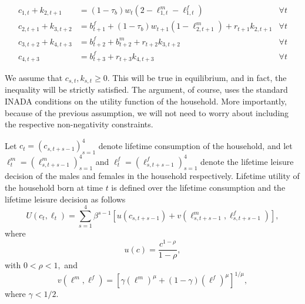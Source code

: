 \documentclass[ProjectUYA]{subfiles}
\begin{document}
  \begin{subequations}
 \label{eq:BCsimplified}
 	 \begin{align}
 	c_{1,t} + k_{2,t+1} &= (1-\tau_b)w_t (2-\ell_{1,t}^m - \ell_{1,t}^f) & \forall t \\
 	c_{2,t+1} + k_{3,t+2} &= b_{t+1}^f+(1-\tau_b)w_{t+1} (1-\ell_{2,t+1}^m ) + r_{t+1}k_{2,t+1} & \forall t \\
 	c_{3,t+2} + k_{4,t+3} &= b_{t+2}^f+ b_{t+2}^m  + r_{t+2}k_{3,t+2} & \forall t \\
 	c_{4,t+3}  &= b_{t+3}^f + r_{t+3}k_{4,t+3} & \forall t
 \end{align}
 \end{subequations}
 
 We assume that $c_{s,t},k_{s,t}\geq 0.$ This will be true in equilibrium, and in fact, the inequality will be strictly satisfied. The argument, of course, uses the standard INADA conditions on the utility function of the household. More importantly, because of the previous assumption, we will not need to worry about including the respective non-negativity constraints. 

 Let $c_t=(c_{s,t+s-1})_{s=1}^4$ denote lifetime consumption of the household, and let $\ell_t^m=(\ell_{s,t+s-1}^m)_{s=1}^4$ and $\ell_t^f=(\ell_{s,t+s-1}^f)_{s=1}^4$ denote the lifetime leisure decision of the males and females in the household respectively. Lifetime utility of the household born at time $t$ is defined over the lifetime consumption and the lifetime leisure decision as follows
 \begin{equation}
 	\label{eq:periodU}
 	U(c_t,\ell_t)=\sum_{s=1}^4 \beta^{s-1} \left[ u(c_{s,t+s-1}) + v(\ell_{s,t+s-1}^m,\ell_{s,t+s-1}^f) \right],
 \end{equation}
 where 
 \begin{equation}
 	\label{eq:CRRA}
 	u(c)=\frac{c^{1-\rho}}{1-\rho},
 \end{equation}
 with $0<\rho<1,$ and 
 \begin{equation}
 	\label{eq:utilleisure}
 	v(\ell^m,\ell^f)=\left[\gamma (\ell^m)^\mu +(1-\gamma)(\ell^f)^\mu\right]^{1/\mu},
 \end{equation}
 where $\gamma<1/2.$
\end{document}
